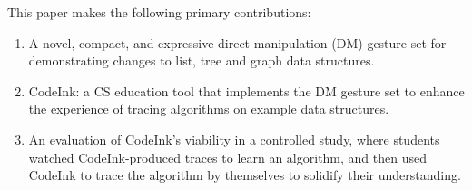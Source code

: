 This paper makes the following primary contributions:

\begin{enumerate} %

\item A novel, compact, and expressive direct manipulation (DM) gesture
set for demonstrating changes to list, tree and graph data structures.

\item CodeInk: a CS education tool that implements the DM gesture set to
enhance the experience of tracing algorithms on example data structures.

\item An evaluation of CodeInk's viability in a controlled study, where
students watched CodeInk-produced traces to learn an algorithm, and then
used CodeInk to trace the algorithm by themselves to solidify their
understanding.

\end{enumerate}
